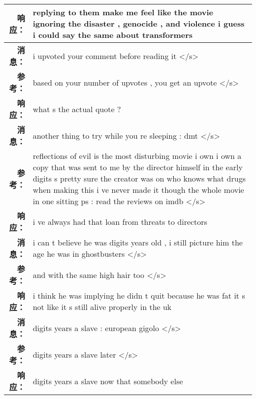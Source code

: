 \begin{tabularx}{\textwidth}{@{}rX@{}}
\textbf{响应：}&replying to them make me feel like the movie ignoring the disaster , genocide , and violence i guess i could say the same about transformers\\%
\midrule%
\textbf{消息：}&i upvoted your comment before reading it </s>\\%
\textbf{参考：}&based on your number of upvotes , you get an upvote </s>\\%
\textbf{响应：}&what s the actual quote ?\\%
\midrule%
\textbf{消息：}&another thing to try while you re sleeping : dmt </s>\\%
\textbf{参考：}&reflections of evil is the most disturbing movie i own i own a copy that was sent to me by the director himself in the early digits s pretty sure the creator was on who knows what drugs when making this i ve never made it though the whole movie in one sitting ps : read the reviews on imdb </s>\\%
\textbf{响应：}&i ve always had that loan from threats to directors\\%
\midrule%
\textbf{消息：}&i can t believe he was digits years old , i still picture him the age he was in ghostbusters </s>\\%
\textbf{参考：}&and with the same high hair too </s>\\%
\textbf{响应：}&i think he was implying he didn t quit because he was fat it s not like it s still alive properly in the uk\\%
\midrule%
\textbf{消息：}&digits years a slave : european gigolo </s>\\%
\textbf{参考：}&digits years a slave later </s>\\%
\textbf{响应：}&digits years a slave now that somebody else\\%
\midrule\bottomrule%
%
\end{tabularx}